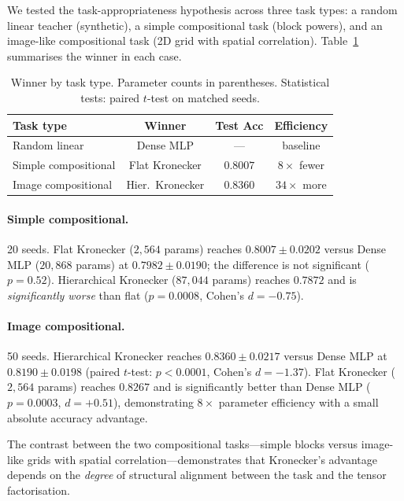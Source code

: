\documentclass[11pt,a4paper]{article}
\begin{document}
We tested the task-appropriateness hypothesis across three task types:
a random linear teacher (synthetic), a simple compositional task
(block powers), and an image-like compositional task
(2D grid with spatial correlation). Table~\ref{tab:kronecker} summarises
the winner in each case.

\begin{table}[h]
\centering
\caption{Winner by task type. Parameter counts in parentheses.
Statistical tests: paired $t$-test on matched seeds.}
\label{tab:kronecker}
\small
\begin{tabular}{lccc}
\toprule
Task type & Winner & Test Acc & Efficiency \\
\midrule
Random linear           & Dense MLP         & ---      & baseline \\
Simple compositional    & Flat Kronecker    & $0.8007$ & $8\times$ fewer \\
Image compositional     & Hier.\ Kronecker  & $0.8360$ & $34\times$ more \\
\bottomrule
\end{tabular}
\end{table}

\paragraph{Simple compositional.}
20 seeds. Flat Kronecker ($2{,}564$ params) reaches
$0.8007 \pm 0.0202$ versus Dense MLP ($20{,}868$ params) at
$0.7982 \pm 0.0190$; the difference is not significant
($p = 0.52$). Hierarchical Kronecker ($87{,}044$ params) reaches
$0.7872$ and is \emph{significantly worse} than flat
($p = 0.0008$, Cohen's $d = -0.75$).

\paragraph{Image compositional.}
50 seeds. Hierarchical Kronecker reaches $0.8360 \pm 0.0217$ versus
Dense MLP at $0.8190 \pm 0.0198$ (paired $t$-test:
$p < 0.0001$, Cohen's $d = -1.37$). Flat Kronecker
($2{,}564$ params) reaches $0.8267$ and is significantly better than
Dense MLP ($p = 0.0003$, $d = +0.51$), demonstrating $8\times$ parameter
efficiency with a small absolute accuracy advantage.

The contrast between the two compositional tasks---simple blocks versus
image-like grids with spatial correlation---demonstrates that
Kronecker's advantage depends on the \emph{degree} of structural alignment
between the task and the tensor factorisation.
\end{document}

